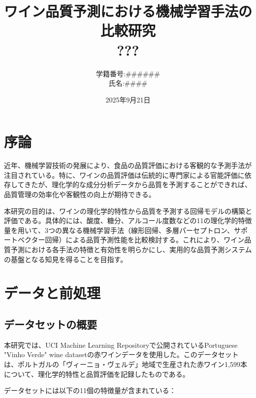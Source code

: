 \documentclass[12pt,a4paper,dvipdfmx]{jsarticle}
\title{ワイン品質予測における機械学習手法の比較研究\\
{\large ???}}
\author{学籍番号:\#\#\#\#\#\#\\
氏名:\#\#\#\#}
\date{2025年9月21日}
\begin{document}
\maketitle

\section{序論}

近年、機械学習技術の発展により、食品の品質評価における客観的な予測手法が注目されている。\cite{Yang2025}特に、ワインの品質評価は伝統的に専門家による官能評価に依存してきたが、理化学的な成分分析データから品質を予測することができれば、品質管理の効率化や客観性の向上が期待できる。

本研究の目的は、ワインの理化学的特性から品質を予測する回帰モデルの構築と評価である。具体的には、酸度、糖分、アルコール度数などの11の理化学的特徴量を用いて、3つの異なる機械学習手法（線形回帰、多層パーセプトロン、サポートベクター回帰）による品質予測性能を比較検討する。これにより、ワイン品質予測における各手法の特徴と有効性を明らかにし、実用的な品質予測システムの基盤となる知見を得ることを目指す。

\section{データと前処理}

\subsection{データセットの概要}

本研究では、UCI Machine Learning Repositoryで公開されているPortuguese "Vinho Verde" wine dataset\cite{Cortez2009}\cite{UCIWineQuality}の赤ワインデータを使用した。このデータセットは、ポルトガルの「ヴィーニョ・ヴェルデ」地域で生産された赤ワイン1,599本について、理化学的特性と品質評価を記録したものである。

データセットには以下の11個の特徴量が含まれている：
\end{document}
